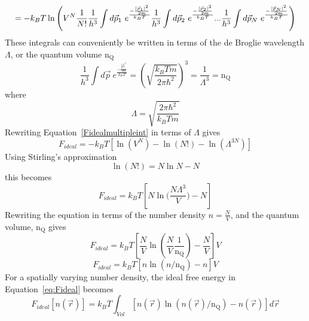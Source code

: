 \documentclass[double,12pt]{beavtex}
\begin{document}
\begin{equation}{\label{Fidealmultipleint}}{=-k_BT\ln\left(V^N\frac{1}{N!}\frac{1}{h^{3}}\int{d\vec{p}_1}~e^\frac{-\frac{|\vec{p}_1|^2}{2m}}{k_BT}\frac{1}{h^{3}}\int{d\vec{p}_2}~e^\frac{-\frac{|\vec{p}_2|^2}{2m}}{k_BT}{...}\frac{1}{h^{3}}\int{d\vec{p}_N}~e^\frac{-\frac{|\vec{p}_N|^2}{2m}}{k_BT}\right)}\end{equation}
These integrals can conveniently be written in terms of the de Broglie 
wavelength $\Lambda$, or the quantum volume $\text{n}_\text{Q}$
\begin{equation}{\frac{1}{h^{3}}\int{d\vec{p}}~e^\frac{-\frac{|\vec{p}|^2}{2m}}{k_BT}=\left(\sqrt{\frac{k_BTm}{2\pi\hbar^2}}\right)^3=\frac{1}{\Lambda^{3}}}=\text{n}_\text{Q}\end{equation} 
where \begin{equation}{\Lambda =\sqrt{\frac{2\pi\hbar^2}{k_BTm}}}\end{equation} 
Rewriting Equation~\ref{Fidealmultipleint} in terms of $\Lambda$ gives
\begin{equation}{F_{ideal}= -k_BT[\ln(V^N)-\ln(N!) - \ln(\Lambda^{3N})]}\end{equation}
Using Stirling's approximation \begin{equation}{\ln(N!)=N\ln{N}-N}\end{equation} 
this becomes
\begin{equation}{F_{ideal}= k_BT[N\ln(\frac{N\Lambda^{3}}{V}{)-N}]}\end{equation} 
Rewriting the equation in terms of the number density $n=\frac{N}{V}$, 
and the quantum volume, $\text{n}_\text{Q}$ gives
\begin{equation}{F_{ideal}= k_BT\left[\frac{N}{V}\ln{\left(\frac{N}{V}\frac{1}{\text{n}_\text{Q}}\right)}-\frac{N}{V}\right]}V\end{equation}
\begin{equation}\label{eq:Fideal}{F_{ideal}= k_BT[n\ln(n/\text{n}_\text{Q})-n]V}\end{equation}   
For a spatially varying number density, the ideal free energy in 
Equation~\ref{eq:Fideal} becomes
\begin{equation}\label{eq:Fideal-n(r)}{F_{ideal}[n(\vec{r})]= k_BT\int_{Vol}[n(\vec{r})\ln(n(\vec{r})/\text{n}_\text{Q})-n(\vec{r})]d\vec{r}}\end{equation} 
\end{document}
